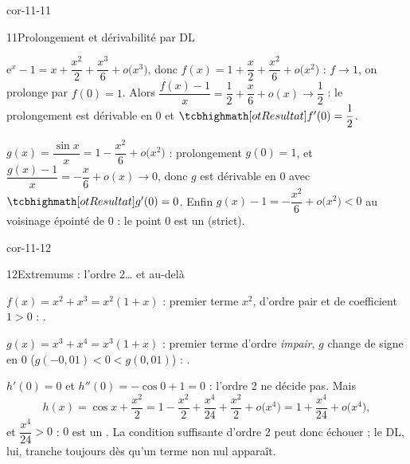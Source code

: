 \begin{blocLivre}{cor-11-11}
\begin{corrige}{11}{Prolongement et dérivabilité par DL}
\begin{questions}
  \item $\mathrm{e}^{x}-1=x+\dfrac{x^{2}}{2}+\dfrac{x^{3}}{6}+o\bigl(x^{3}\bigr)$,
    donc $f(x)=1+\dfrac{x}{2}+\dfrac{x^{2}}{6}+o\bigl(x^{2}\bigr)$ :
    $f\to1$, on prolonge par $f(0)=1$. Alors
    $\dfrac{f(x)-1}{x}=\dfrac12+\dfrac{x}{6}+o(x)\to\dfrac12$ :
    le prolongement est dérivable en $0$ et $\res{f'(0)=\dfrac12}$.
  \item $g(x)=\dfrac{\sin x}{x}=1-\dfrac{x^{2}}{6}+o\bigl(x^{2}\bigr)$ :
    prolongement $g(0)=1$, et $\dfrac{g(x)-1}{x}=-\dfrac{x}{6}+o(x)\to0$,
    donc $g$ est dérivable en $0$ avec $\res{g'(0)=0}$. Enfin
    $g(x)-1=-\dfrac{x^{2}}{6}+o\bigl(x^{2}\bigr)<0$ au voisinage épointé
    de $0$ : le point $0$ est un  (strict).
\end{questions}
\end{corrige}
\end{blocLivre}

\begin{blocLivre}{cor-11-12}
\begin{corrige}{12}{Extremums : l'ordre 2… et au-delà}
\begin{questions}
  \item $f(x)=x^{2}+x^{3}=x^{2}(1+x)$ : premier terme $x^{2}$, d'ordre pair
    et de coefficient $1>0$ : .
  \item $g(x)=x^{3}+x^{4}=x^{3}(1+x)$ : premier terme d'ordre \emph{impair},
    $g$ change de signe en $0$ ($g(-0{,}01)<0<g(0{,}01)$) :
    .
  \item $h'(0)=0$ et $h''(0)=-\cos0+1=0$ : l'ordre 2 ne décide pas. Mais
    \[
    h(x)=\cos x+\frac{x^{2}}{2}
    =1-\frac{x^{2}}{2}+\frac{x^{4}}{24}+\frac{x^{2}}{2}+o\bigl(x^{4}\bigr)
    =1+\frac{x^{4}}{24}+o\bigl(x^{4}\bigr),
    \]
    et $\dfrac{x^{4}}{24}>0$ : $0$ est un .
    La condition suffisante d'ordre 2 peut donc échouer ; le DL, lui,
    tranche toujours dès qu'un terme non nul apparaît.
\end{questions}
\end{corrige}
\end{blocLivre}

